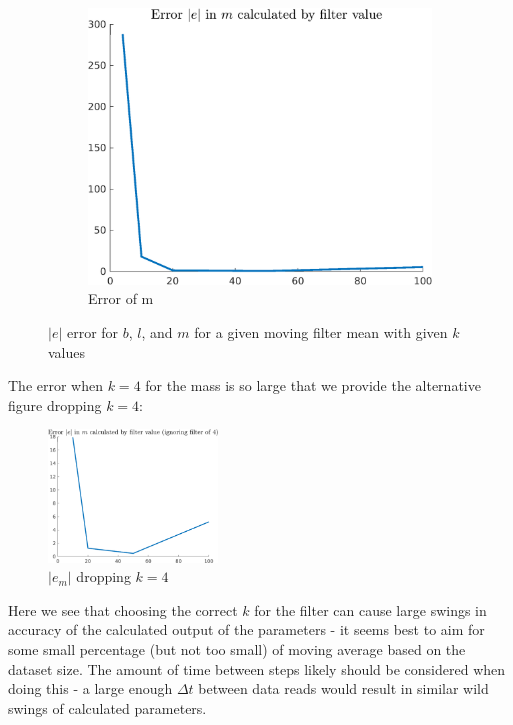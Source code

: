 \documentclass{article}
\begin{document}
\begin{figure}[H]
\begin{subfigure}{0.325\textwidth}
        \centering
        \includegraphics[width = \textwidth]{figures/filter_m_error.png}
        \caption{Error of m}
    \end{subfigure}
    \caption{$|e|$ error for $b$, $l$, and $m$ for a given moving filter mean with given $k$ values}
    \label{fig:b-3_results}
\end{figure}

The error when $k=4$ for the mass is so large that we provide the alternative figure dropping $k=4$:

\begin{figure}[H]
    \centering
    \includegraphics[width = 0.4\textwidth]{figures/filter_m_error_2.png}
    \caption{$|e_m|$ dropping $k=4$}
\end{figure}

Here we see that choosing the correct $k$ for the filter can cause large swings in accuracy of the calculated output of the parameters - it seems best to aim for some small percentage (but not too small) of moving average based on the dataset size. The amount of time between steps likely should be considered when doing this - a large enough $\Delta t$ between data reads would result in similar wild swings of calculated parameters.
\end{document}
